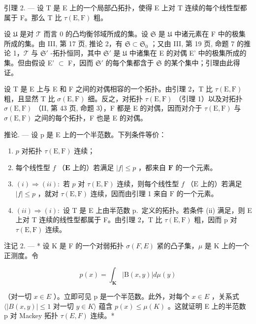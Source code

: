 引理 2. --- 设 T 是 E 上的一个局部凸拓扑，使得 E 上对 T 连续的每个线性型都属于 F。那么 T 比 \(\tau(\mathrm{E}, \mathrm{F})\) 粗。

设 \(\mathfrak{U}\) 是对 \(\mathcal{T}\) 而言 0 的凸均衡邻域所成的集。设 \(\mathfrak{S}\) 是 \(\mathfrak{U}\) 中诸元素在 F 中的极集所成的集。由 III, 第 17 页, 推论 2，有 \(\mathfrak{S} \subset \mathfrak{S}_0\) ；又由 III, 第 19 页, 命题 7 的推论 1，\(\mathcal{T}\) 与 \(\mathfrak{S}'\) -拓扑恒同，其中 \(\mathfrak{S}'\) 是 \(\mathfrak{U}\) 中诸集在 E 的对偶 E' 中的极集所成的集。但由假设 E' \(\subset\) F，因而 \(\mathfrak{S}'\) 的每个集都含于 \(\mathfrak{S}\) 的某个集中；引理由此得证。

设 T 是 E 上与 E 和 F 之间的对偶相容的一个拓扑。由引理 2，T 比 \(\tau(\mathrm{E},\mathrm{F})\) 粗，且显然 T 比 \(\sigma(\mathrm{E},\mathrm{F})\) 细。反之，对拓扑 \(\tau(\mathrm{E},\mathrm{F})\) （引理 1）以及对拓扑 \(\sigma(\mathrm{E},\mathrm{F})\) （II, 第 43 页, 命题 3），F 都是 E 的对偶，因而对介于 \(\tau(\mathrm{E},\mathrm{F})\) 与 \(\sigma(\mathrm{E},\mathrm{F})\) 之间的每个拓扑，F 也是 E 的对偶。

推论. --- 设 p 是 E 上的一个半范数。下列条件等价：

\begin{enumerate}
\def\labelenumi{(\roman{enumi})}
\item
  \(p\) 对拓扑 \(\tau(\mathrm{E},\mathrm{F})\) 连续；
\item
  每个线性型 \(f\) （\(\mathbf{E}\) 上的）若满足 \(|f| \leqslant p\) ，都来自 \(\mathbf{F}\) 的一个元素。
\item[]
  \((i) \Rightarrow (ii):\) 若 \(p\) 对 \(\tau(\mathrm{E},\mathrm{F})\) 连续，则每个线性型 \(f\) （\(\mathrm{E}\) 上的）若满足 \(|f|\leqslant p\) ，就对 \(\tau(\mathrm{E},\mathrm{F})\) 连续，因而由引理 1 来自 \(\mathrm{F}\) 的一个元素。
\item[]
  \((ii) \Rightarrow (i):\) 设 T 是 E 上由半范数 p.~定义的拓扑。若条件 (ii) 满足，则 E 上对 T 连续的线性型都属于 F。由引理 2，T 比 \(\tau(\mathrm{E}, \mathrm{F})\) 粗，因而 p 对 \(\tau(\mathrm{E}, \mathrm{F})\) 连续。
\end{enumerate}

注记 2. --- * 设 K 是 F 的一个对弱拓扑 \(\sigma(F, E)\) 紧的凸子集，\(\mu\) 是 K 上的一个正测度。令

\[
p (x) = \int_ {\mathbf {K}} | \mathrm{B} (x, y) | d \mu (y)
\]

（对一切 \(x \in E\) ）。立即可见 p 是一个半范数。此外，对每个 \(x \in E\) ，关系式 \(\langle |B(x, y)| \leqslant 1 \text{ 对一切 } y \in K \rangle\) 蕴含 \(p(x) \leqslant \mu(K)\) 。这就证明 E 上的半范数 p 对 Mackey 拓扑 \(\tau(E, F)\) 连续。*

